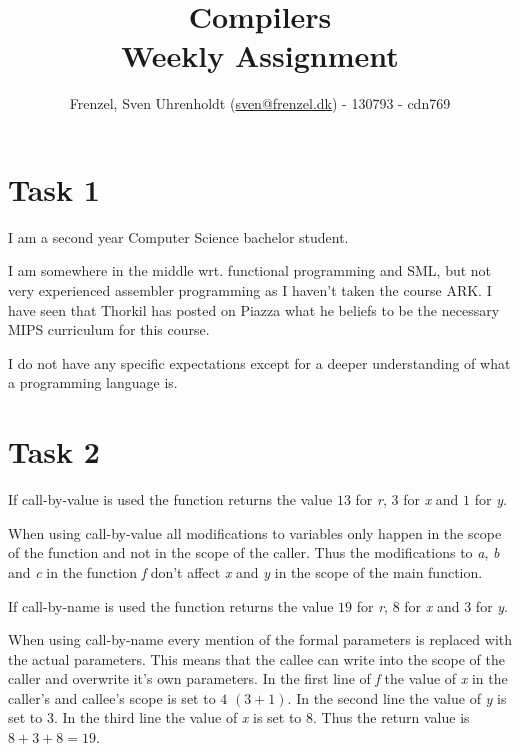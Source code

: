 \documentclass[11pt,a4paper]{article}
\author{
  \Large{
    Frenzel, Sven Uhrenholdt (\href{mailto:sven@frenzel.dk}{sven@frenzel.dk}) - 130793 - cdn769}\\
}
\title{
  \huge{Compilers\\}
\vspace{3cm}
\Large{\nth{1} Weekly Assignment}
}
\theoremstyle{plain}
\theoremstyle{definition}
\theoremstyle{remark}
\numberwithin{equation}{section}
\begin{document}


\clearpage\maketitle
\thispagestyle{empty}

\clearpage\newpage
\thispagestyle{plain}


\section*{Task 1}
I am a second year Computer Science bachelor student.

I am somewhere in the middle wrt. functional programming and SML, but not very experienced assembler programming as I haven't taken the course ARK. I have seen that Thorkil has posted on Piazza what he beliefs to be the necessary MIPS curriculum for this course.

I do not have any specific expectations except for a deeper understanding of what a programming language is.

\section*{Task 2}
If call-by-value is used the function returns the value $13$ for \textit{r}, $3$ for \textit{x} and $1$ for \textit{y}.

When using call-by-value all modifications to variables only happen in the scope of the function and not in the scope of the caller. Thus the modifications to \textit{a}, \textit{b} and \textit{c} in the function \textit{f} don't affect \textit{x} and \textit{y} in the scope of the main function.

If call-by-name is used the function returns the value $19$ for \textit{r}, $8$ for \textit{x} and $3$ for \textit{y}.

When using call-by-name every mention of the formal parameters is replaced with the actual parameters. This means that the callee can write into the scope of the caller and overwrite it's own parameters. In the first line of \textit{f} the value of \textit{x} in the caller's and callee's scope is set to $4$ $(3+1)$. In the second line the value of \textit{y} is set to 3. In the third line the value of \textit{x} is set to 8.
Thus the return value is $8+3+8=19$.
\end{document}
